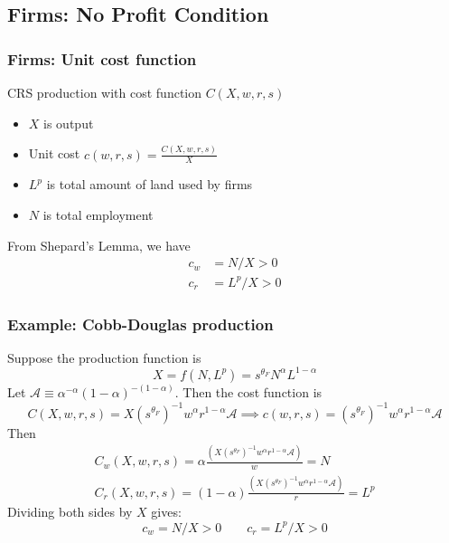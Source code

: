 \documentclass[11pt,notes=hide,aspectratio=169]{beamer}
\begin{document}
\subsection{Firms: No Profit Condition}
\begin{frame}
\frametitle{Firms: Unit cost function}
CRS production with cost function $C(X, w,r,s)$ 
\begin{itemize}
\item  $X$ is output
\item Unit cost $c(w, r, s)=\frac{C(X,w,r,s)}{X}$
\item $L^p$ is total amount of land used by firms
\item $N$ is total employment \medskip
\end{itemize}
From Shepard's Lemma, we have
\begin{align*}
c_w &= N/X >0 \\
c_r &= L^p/X >0
\end{align*}
\end{frame}
\begin{frame}
\frametitle{Example: Cobb-Douglas production}
Suppose the production function is
$$X=f(N,L^p)= s^{\theta_F} N^\alpha L^{1-\alpha}$$
Let $\mathcal{A} \equiv \alpha^{-\alpha} (1-\alpha)^{-(1-\alpha)}$.
Then the cost function is
\begin{equation*}
C(X,w,r,s) 
= X (s^{\theta_F})^{-1}w^\alpha r^{1-\alpha} \mathcal{A}
\implies
c(w,r,s)
=(s^{\theta_F})^{-1}w^\alpha r^{1-\alpha} \mathcal{A}
\end{equation*}
Then 
\begin{align*}
C_w(X,w,r,s) = \alpha \frac{\left(X (s^{\theta_F})^{-1}w^\alpha r^{1-\alpha} \mathcal{A} \right)}{w} = N \\
C_r(X,w,r,s) = (1-\alpha) \frac{\left(X (s^{\theta_F})^{-1}w^\alpha r^{1-\alpha} \mathcal{A} \right)}{r} = L^p
\end{align*}
Dividing both sides by $X$ gives:
\begin{equation*}
c_w = N/X >0
\qquad
c_r = L^p/X >0
\end{equation*}
\end{frame}
\end{document}
